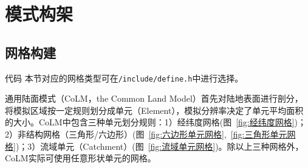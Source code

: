 \chapter{模式构架}\label{模式构架}
\section{网格构建}\label{网格构建}
\begin{mymdframed}{代码}
  本节对应的网格类型可在\texttt{/include/define.h}中进行选择。
\end{mymdframed}

通用陆面模式（CoLM，the Common Land Model）首先对陆地表面进行剖分，将模拟区域按一定规则划分成单元（Element），模拟分辨率决定了单元平均面积的大小。CoLM中包含三种单元划分规则：1）经纬度网格(图~\ref{fig:经纬度网格})；2）非结构网格（三角形/六边形）(图~\ref{fig:六边形单元网格},~\ref{fig:三角形单元网格})；3）流域单元（Catchment）(图~\ref{fig:流域单元网格})。除以上三种网格外，CoLM实际可使用任意形状单元的网格。

